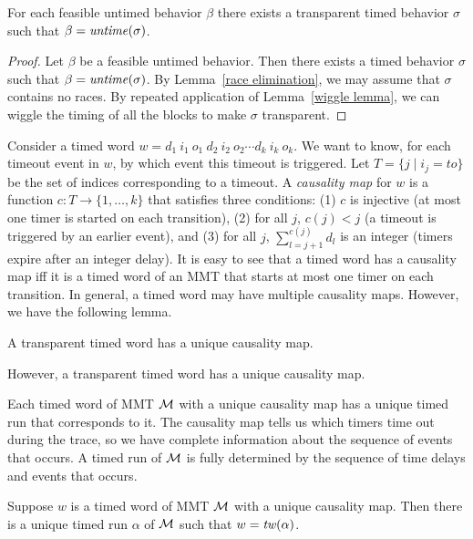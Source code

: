 \begin{lemma}
\label{lemma: transparent timed behavior}
For each feasible untimed behavior $\beta$ there exists
a transparent timed behavior $\sigma$ such that $\beta = \mathit{untime}(\sigma)$.
\end{lemma}
\iflong
\begin{proof}
Let $\beta$ be a feasible untimed behavior.
Then there exists a timed behavior $\sigma$ such that $\beta = \mathit{untime}(\sigma)$.
By Lemma~\ref{race elimination}, we may assume that $\sigma$ contains no races.
By repeated application of Lemma~\ref{wiggle lemma}, we can wiggle the timing of all the blocks to make $\sigma$ transparent.
\end{proof}
\fi

Consider a timed word
$w  =   d_1 ~ i_1 ~ o_1 ~ d_2 ~ i_2 ~ o_2 \cdots d_k ~ i_k ~ o_k$.
We want to know, for each timeout event in $w$, by which event this timeout is triggered.
Let $T = \{ j \mid i_j = \mathit{to} \}$ be the set of indices corresponding to a timeout.
A \emph{causality map} for $w$ is a function $c: T \rightarrow \{ 1 ,\ldots, k \}$ that satisfies three conditions:
(1)
$c$ is injective (at most one timer is started on each transition),
(2)
for all $j$, $c(j) < j$ (a timeout is triggered by an earlier event), and
(3)
for all $j$, $\sum_{l=j+1}^{c(j)} d_l$ is an integer (timers expire after an integer delay).
It is easy to see that a timed word has a causality map iff it is a timed word of an MMT that starts at most one timer
on each transition. In general, a timed word may have multiple causality maps.
\iflong
However, we have the following lemma.

\begin{lemma}
\label{lemma unique causality map}
A transparent timed word has a unique causality map.
\end{lemma}
\else
However, a transparent timed word has a unique causality map.
\fi

Each timed word of MMT ${\cal M}$ with a unique causality map has a unique timed run that corresponds to it.
The causality map tells us which timers time out during the trace, so we have complete information
about the sequence of events that occurs. 
\iflong
A timed run of ${\cal M}$ is fully determined
by the sequence of time delays and events that occurs.

\begin{lemma}
\label{lemma unique timed run}
Suppose $w$ is a timed word of MMT ${\cal M}$ with a unique causality map.
Then there is a unique timed run $\alpha$ of ${\cal M}$ such that $w = \mathit{tw}(\alpha)$.
\end{lemma}

